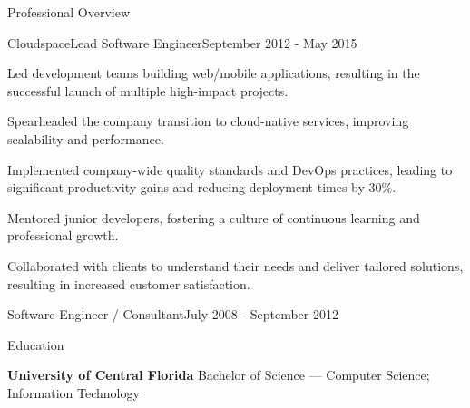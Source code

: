\documentclass{resume} %
\begin{document}
\begin{rSection}{Professional Overview}
  \begin{rNewRole}{Cloudspace}{Lead Software Engineer}{September 2012 - May 2015}
    \item Led development teams building web/mobile applications, resulting in the successful launch of multiple high-impact projects.
    \item Spearheaded the company transition to cloud-native services, improving scalability and performance.
    \item Implemented company-wide quality standards and DevOps practices, leading to significant productivity gains and reducing deployment times by 30\%.
    \item Mentored junior developers, fostering a culture of continuous learning and professional growth.
    \item Collaborated with clients to understand their needs and deliver tailored solutions, resulting in increased customer satisfaction.
  \end{rNewRole}
  
  
  \begin{rCompany}{Software Engineer / Consultant}{July 2008 - September 2012}{}

  \end{rCompany}
  
  
  
\end{rSection}

\vspace{0.5em} %
\begin{rSection}{Education}
  
  {\bf University of Central Florida } Bachelor of Science --- Computer Science; Information Technology
  
\end{rSection}
\end{document}
